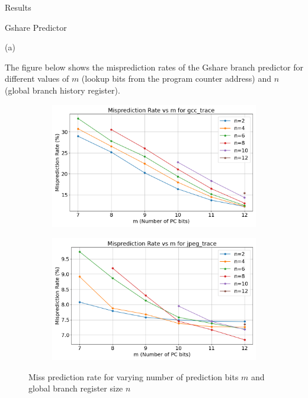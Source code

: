 \begin{section}{Results}
    \begin{subsection}{Gshare Predictor}
        
        \begin{center}
            (a)
        \end{center}

        The figure below shows the misprediction rates of the Gshare branch predictor for different values of $m$ (lookup bits from the program counter address) and $n$ (global branch history register).

        \begin{figure}[h] %
            \centering
            \begin{subfigure}[b]{0.45\textwidth}
                \centering
                \includegraphics[width=\textwidth]{figures/fig2/gcc_misprediction_plot.png} %
                \label{fig:pic1}
            \end{subfigure}
            \hfill
            \begin{subfigure}[b]{0.45\textwidth}
                \centering
                \includegraphics[width=\textwidth]{figures/fig2/jpeg_misprediction_plot.png} %
                \label{fig:pic2}
            \end{subfigure}
            \caption{Miss prediction rate for varying number of prediction bits $m$ and global branch register size $n$}
            \label{fig:twopictures}
        \end{figure}


\end{subsection}
\end{section}
